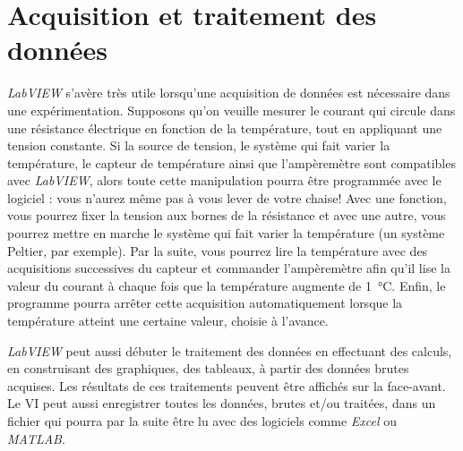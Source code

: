 \documentclass[12pt,oneside,letterpaper]{article}
\begin{document}
\section{Acquisition et traitement des données}

\textit{LabVIEW} s'avère très utile lorsqu'une acquisition de données est nécessaire dans une expérimentation. Supposons qu'on veuille mesurer le courant qui circule dans une résistance électrique en fonction de la température, tout en appliquant une tension constante. Si la source de tension, le système qui fait varier la température, le capteur de température ainsi que l'ampèremètre sont compatibles avec \textit{LabVIEW}, alors toute cette manipulation pourra être programmée avec le logiciel : vous n'aurez même pas à vous lever de votre chaise! Avec une fonction, vous pourrez fixer la tension aux bornes de la résistance et avec une autre, vous pourrez mettre en marche le système qui fait varier la température (un système Peltier, par exemple). Par la suite, vous pourrez lire la température avec des acquisitions successives du capteur et commander l'ampèremètre afin qu'il lise la valeur du courant à chaque fois que la température augmente de 1~°C. Enfin, le programme pourra arrêter cette acquisition automatiquement lorsque la température atteint une certaine valeur, choisie à l'avance.

\textit{LabVIEW} peut aussi débuter le traitement des données en effectuant des calculs, en construisant des graphiques, des tableaux, à partir des données brutes acquises. Les résultats de ces traitements peuvent être affichés sur la face-avant. Le VI peut aussi enregistrer toutes les données, brutes et/ou traitées, dans un fichier qui pourra par la suite être lu avec des logiciels comme \textit{Excel} ou \textit{MATLAB}.
\end{document}
